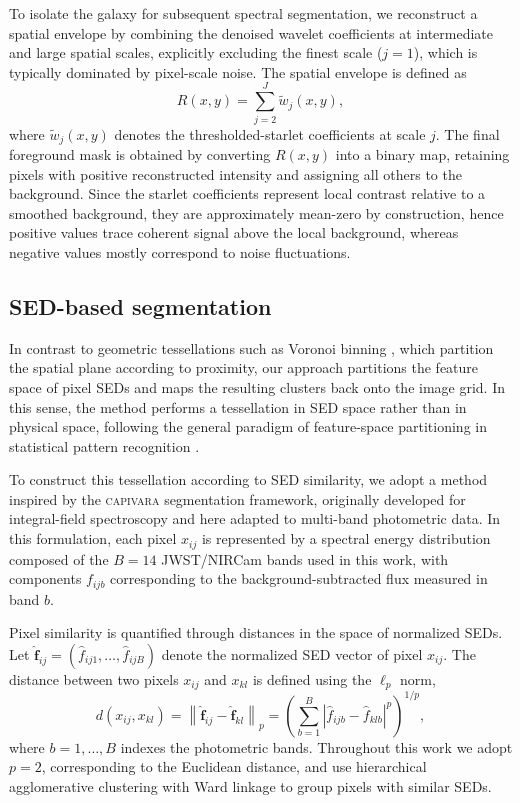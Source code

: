 \documentclass[fleqn,usenatbib]{mnras}
\begin{document}
To isolate the galaxy for subsequent spectral segmentation, we reconstruct a spatial envelope by combining the denoised wavelet coefficients at intermediate and large spatial scales, explicitly excluding the finest scale ($j=1$), which is typically dominated by pixel-scale noise. The spatial envelope is defined as
\begin{equation}
R(x,y) = \sum_{j=2}^{J} \widetilde{w}_j(x,y),
\end{equation}
where $\widetilde{w}_j(x,y)$ denotes the thresholded-starlet coefficients at scale $j$. 
The final foreground mask is obtained by converting $R(x,y)$ into a binary map, retaining pixels with positive reconstructed intensity and assigning all others to the background. Since the starlet coefficients represent local contrast relative to a smoothed background, they are approximately mean-zero by construction, hence positive values trace coherent signal above the local background, whereas negative values mostly correspond to noise fluctuations.


\subsection{SED-based segmentation}


In contrast to geometric tessellations such as Voronoi binning \citep{Voronoi1908,Franz91,Cappellari2003}, which partition the spatial plane according to proximity, our approach partitions the feature space of pixel SEDs and maps the resulting clusters back onto the image grid. In this sense, the method performs a tessellation in SED space rather than in physical space, following the general paradigm of feature-space partitioning in statistical pattern recognition \citep{bishop2006pattern}.

To construct this tessellation according to SED similarity, we adopt a method inspired by the \textsc{capivara} segmentation framework, originally developed for integral-field spectroscopy and here adapted to multi-band photometric data. In this formulation, each pixel $x_{ij}$ is represented by a spectral energy distribution composed of the $B=14$ JWST/NIRCam bands used in this work, with components $f_{ijb}$ corresponding to the background-subtracted flux measured in band $b$.


Pixel similarity is quantified through distances in the space of normalized SEDs. 
Let $\widehat{\mathbf f}_{ij} = (\widehat f_{ij1},\ldots,\widehat f_{ijB})$ denote the normalized SED vector of pixel $x_{ij}$. 
The distance between two pixels $x_{ij}$ and $x_{kl}$ is defined using the $\ell_p$ norm,
\begin{equation}
d(x_{ij},x_{kl}) =
\left\lVert
\widehat{\mathbf f}_{ij} - \widehat{\mathbf f}_{kl}
\right\rVert_p
=
\left(
\sum_{b=1}^{B}
\left|
\widehat f_{ijb} - \widehat f_{klb}
\right|^p
\right)^{1/p},
\label{eq:lp_phot}
\end{equation}
where $b=1,\ldots,B$ indexes the photometric bands.
Throughout this work we adopt $p=2$, corresponding to the Euclidean distance, and use hierarchical agglomerative clustering with Ward linkage to group pixels with similar SEDs.
\end{document}

